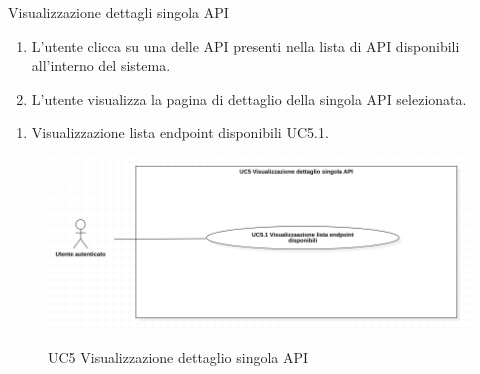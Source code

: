 \begin{usecase}{5}{Visualizzazione dettagli singola API}\label{uc:visualizzazione-dettagli-singola-api}

    \usecasemain{}
        \begin{enumerate}
            \item L'utente clicca su una delle API presenti nella lista di API disponibili all'interno del sistema.
            \item L'utente visualizza la pagina di dettaglio della singola API selezionata.
        \end{enumerate}

    \usecasegen{}
        \begin{enumerate}
            \item Visualizzazione lista endpoint disponibili UC5.1.
        \end{enumerate}

\end{usecase}

\begin{figure}[!ht] 
    \centering 
    \includegraphics[width=0.9\columnwidth, alt={Caso d'uso relativo alla visualizzazione del dettaglio di una singola API}]{images/usecase/UC5.jpg}
    \caption{UC5 Visualizzazione dettaglio singola API}\label{fig:uc:visualizzazione-dettaglio-singola-api}
  \end{figure}


